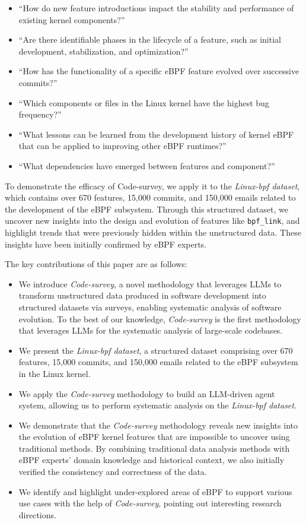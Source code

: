 \documentclass[sigconf,review,anonymous]{acmart}
\begin{document}
\begin{itemize}
    \item ``How do new feature introductions impact the stability and performance of existing kernel components?''
    \item ``Are there identifiable phases in the lifecycle of a feature, such as initial development, stabilization, and optimization?''
    \item ``How has the functionality of a specific eBPF feature evolved over successive commits?''
    \item ``Which components or files in the Linux kernel have the highest bug frequency?''
    \item ``What lessons can be learned from the development history of kernel eBPF that can be applied to improving other eBPF runtimes?''
    \item ``What dependencies have emerged between features and component?''
\end{itemize}

To demonstrate the efficacy of Code-survey, we apply it to the \textit{Linux-bpf dataset}, which contains over 670 features, 15,000 commits, and 150,000 emails related to the development of the eBPF subsystem. Through this structured dataset, we uncover new insights into the design and evolution of features like \texttt{bpf\_link}, and highlight trends that were previously hidden within the unstructured data. These insights have been initially confirmed by eBPF experts.

The key contributions of this paper are as follows:

\begin{itemize}
    \item We introduce \emph{Code-survey}, a novel methodology that leverages LLMs to transform unstructured data produced in software development into structured datasets via surveys, enabling systematic analysis of software evolution. To the best of our knowledge, \emph{Code-survey} is the first methodology that leverages LLMs for the systematic analysis of large-scale codebases.
    \item We present the \textit{Linux-bpf dataset}, a structured dataset comprising over 670 features, 15,000 commits, and 150,000 emails related to the eBPF subsystem in the Linux kernel.
    \item We apply the \emph{Code-survey} methodology to build an LLM-driven agent system, allowing us to perform systematic analysis on the \textit{Linux-bpf dataset}.
    \item We demonstrate that the \emph{Code-survey} methodology reveals new insights into the evolution of eBPF kernel features that are impossible to uncover using traditional methods. By combining traditional data analysis methods with eBPF experts' domain knowledge and historical context, we also initially verified the consistency and correctness of the data.
    \item We identify and highlight under-explored areas of eBPF to support various use cases with the help of \emph{Code-survey}, pointing out interesting research directions.
\end{itemize}
\end{document}
